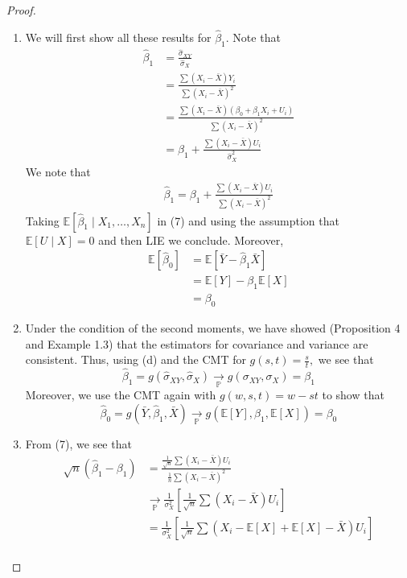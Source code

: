 \documentclass[10pt, oneside]{article}
\newcommand{\bbP}{\mathbb{P}}
\newcommand{\bbE}{\mathbb{E}}
\theoremstyle{definition}
\begin{document}
\begin{proof}
    \begin{enumerate}
        \item We will first show all these results for $\hat\beta_1.$ Note that 
        \begin{align*}
            \hat\beta_1 &= \frac{\hat\sigma_{XY}}{\hat\sigma_X}\\
            &= \frac{\sum(X_i - \bar X)Y_i}{\sum (X_i - \bar X)^2}\\
            &= \frac{\sum (X_i - \bar X)(\beta_0 + \beta_1 X_i + U_i)}{\sum(X_i - \bar X)^2}\\
            &= \beta_1 + \frac{\sum (X_i - \bar X)U_i}{\hat \sigma_X^2}
        \end{align*}
        We note that 
        \begin{align}
            \hat \beta_1 = \beta_1 + \frac{\sum (X_i - \bar X)U_i}{\sum (X_i - \bar X)^2}
        \end{align}
        Taking $\bbE[\hat\beta_1 \mid X_1, \dots, X_n]$ in (7) and using the assumption that $\bbE[U \mid X] = 0$ and then LIE we conclude. Moreover, 
        \begin{align*}
            \bbE[\hat\beta_0] &= \bbE[\bar Y - \hat\beta_1 \bar X]\\
            &= \bbE[Y] - \beta_1 \bbE[X]\\
            &= \beta_0
        \end{align*}
        \item Under the condition of the second moments, we have showed (Proposition 4 and Example 1.3) that the estimators for covariance and variance are consistent. Thus, using (d) and the CMT for $g(s,t) = \frac{s}{t},$ we see that 
        \[\hat\beta_1 = g(\hat\sigma_{XY}, \hat\sigma_X) \xrightarrow[\bbP]{}g(\sigma_{XY}, \sigma_X) = \beta_1\] Moreover, we use the CMT again with $g(w,s,t) = w - st$ to show that
        \[\hat\beta_0 = g(\bar Y, \hat\beta_1, \bar X) \xrightarrow[\bbP]{} g(\bbE[Y], \beta_1, \bbE[X]) = \beta_0\]
        \item From (7), we see that 
        \begin{align*}
            \sqrt{n}(\hat\beta_1 - \beta_1) &= \frac{\frac{1}{\sqrt{n}}\sum (X_i - \bar X)U_i}{\frac{1}{n}\sum (X_i - \bar X)^2}\\
            &\xrightarrow[\bbP]{} \frac{1}{\sigma_X^2} \left[\frac{1}{\sqrt{n}}\sum (X_i - \bar X)U_i\right]\\
            &=  \frac{1}{\sigma_X^2} \left[\frac{1}{\sqrt{n}}\sum (X_i - \bbE[X] + \bbE[X] - \bar X)U_i\right]\\

\end{align*}
\end{enumerate}
\end{proof}
\end{document}
